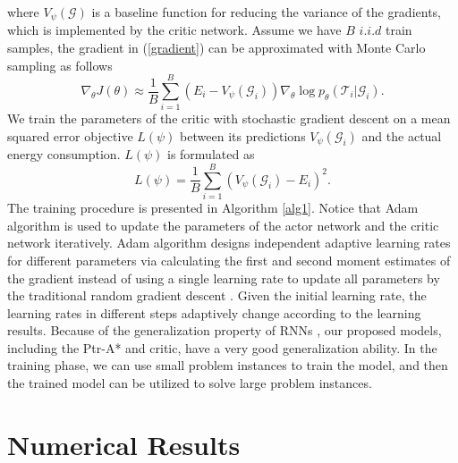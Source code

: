 \documentclass[journal]{IEEEtran}
\begin{document}
	where $V_{\psi}\left(\bm{\mathcal{G}}\right)$ is a baseline function for reducing the variance of the gradients, which is implemented by the critic network. Assume we have $B$ $i.i.d$ train samples, the gradient in (\ref{gradient}) can be approximated with Monte Carlo sampling as follows
	\begin{equation}
	    \nabla_{\theta}J\left(\theta\right) \approx \frac{1}{B} \sum_{i=1}^B \left( E_i-V_{\psi}\left(\bm{\mathcal{G}}_i\right) \right) \nabla_{\theta} \log p_{\theta} \left(\bm{\mathcal{T}}_i|\bm{\mathcal{G}}_i\right).
	\end{equation}
	 We train the parameters of the critic with stochastic gradient descent on a mean squared error objective $L(\psi)$ between its predictions $V_\psi \left(\bm{\mathcal{G}}_i \right)$ and the actual energy consumption. $L(\psi)$ is formulated as
	 \begin{equation}
	     L(\psi) = \frac{1}{B} \sum_{i=1}^B\left(V_{\psi}\left(\bm{\mathcal{G}}_i\right)-E_i\right)^2.
	 \end{equation}
	 The training procedure is presented in Algorithm \ref{alg1}. Notice that Adam algorithm is used to update the parameters of the actor network and the critic network iteratively. Adam algorithm designs independent adaptive learning rates for different parameters via calculating the first and second moment estimates of the gradient instead of using a single learning rate to update all parameters by the traditional random gradient descent \cite{D. P. Kingma}. Given the initial learning rate, the learning rates in different steps adaptively change according to the learning results. Because of the generalization property of RNNs \cite{Z. Tu}, our proposed models, including the Ptr-A* and critic, have a very good generalization ability. In the training phase, we can use small problem instances to train the model, and then the trained model can be utilized to solve large problem instances.
	
\section{Numerical Results}\label{SecVI}
\end{document}
